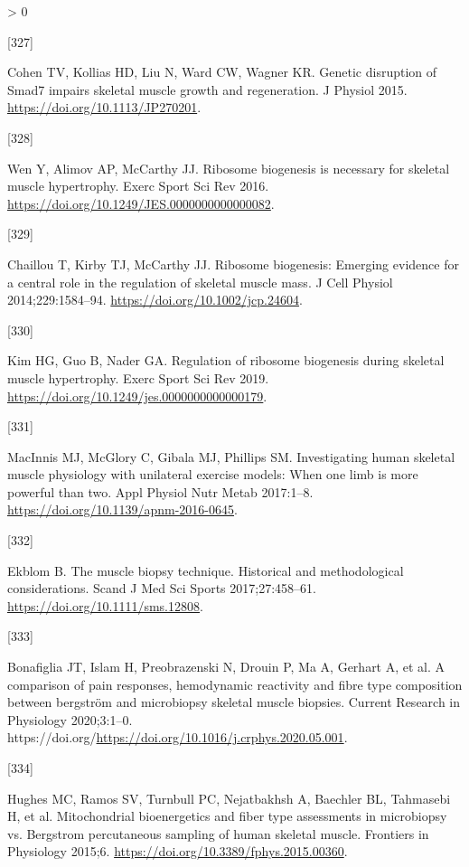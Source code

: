\documentclass[twoside,10pt]{gihclass} %
\newlength{\cslhangindent}
\newlength{\csllabelwidth}
\newenvironment{CSLReferences}[3] %
 {%
  \setlength{\parindent}{0pt}
  \ifodd #1 \everypar{\setlength{\hangindent}{\cslhangindent}}\ignorespaces\fi
  \ifnum #2 > 0
  \setlength{\parskip}{#2\baselineskip}
  \fi
 }%
 {}
\newcommand{\CSLLeftMargin}[1]{\parbox[t]{\maxof{\widthof{#1}}{\csllabelwidth}}{#1}}
\newcommand{\CSLRightInline}[1]{\parbox[t]{\linewidth}{#1}}
\begin{document}
\begin{CSLReferences}{0}{0}
\leavevmode\hypertarget{ref-RN1619}{}%
\CSLLeftMargin{{[}327{]} }
\CSLRightInline{Cohen TV, Kollias HD, Liu N, Ward CW, Wagner KR. Genetic disruption of Smad7 impairs skeletal muscle growth and regeneration. J Physiol 2015. \url{https://doi.org/10.1113/JP270201}.}

\leavevmode\hypertarget{ref-RN1757}{}%
\CSLLeftMargin{{[}328{]} }
\CSLRightInline{Wen Y, Alimov AP, McCarthy JJ. Ribosome biogenesis is necessary for skeletal muscle hypertrophy. Exerc Sport Sci Rev 2016. \url{https://doi.org/10.1249/JES.0000000000000082}.}

\leavevmode\hypertarget{ref-RN1654}{}%
\CSLLeftMargin{{[}329{]} }
\CSLRightInline{Chaillou T, Kirby TJ, McCarthy JJ. Ribosome biogenesis: Emerging evidence for a central role in the regulation of skeletal muscle mass. J Cell Physiol 2014;229:1584--94. \url{https://doi.org/10.1002/jcp.24604}.}

\leavevmode\hypertarget{ref-RN2150}{}%
\CSLLeftMargin{{[}330{]} }
\CSLRightInline{Kim HG, Guo B, Nader GA. Regulation of ribosome biogenesis during skeletal muscle hypertrophy. Exerc Sport Sci Rev 2019. \url{https://doi.org/10.1249/jes.0000000000000179}.}

\leavevmode\hypertarget{ref-RN1896}{}%
\CSLLeftMargin{{[}331{]} }
\CSLRightInline{MacInnis MJ, McGlory C, Gibala MJ, Phillips SM. Investigating human skeletal muscle physiology with unilateral exercise models: When one limb is more powerful than two. Appl Physiol Nutr Metab 2017:1--8. \url{https://doi.org/10.1139/apnm-2016-0645}.}

\leavevmode\hypertarget{ref-RN2549}{}%
\CSLLeftMargin{{[}332{]} }
\CSLRightInline{Ekblom B. The muscle biopsy technique. Historical and methodological considerations. Scand J Med Sci Sports 2017;27:458--61. \url{https://doi.org/10.1111/sms.12808}.}

\leavevmode\hypertarget{ref-RN2553}{}%
\CSLLeftMargin{{[}333{]} }
\CSLRightInline{Bonafiglia JT, Islam H, Preobrazenski N, Drouin P, Ma A, Gerhart A, et al. A comparison of pain responses, hemodynamic reactivity and fibre type composition between bergström and microbiopsy skeletal muscle biopsies. Current Research in Physiology 2020;3:1--0. https://doi.org/\url{https://doi.org/10.1016/j.crphys.2020.05.001}.}

\leavevmode\hypertarget{ref-RN2552}{}%
\CSLLeftMargin{{[}334{]} }
\CSLRightInline{Hughes MC, Ramos SV, Turnbull PC, Nejatbakhsh A, Baechler BL, Tahmasebi H, et al. Mitochondrial bioenergetics and fiber type assessments in microbiopsy vs. Bergstrom percutaneous sampling of human skeletal muscle. Frontiers in Physiology 2015;6. \url{https://doi.org/10.3389/fphys.2015.00360}.}


\end{CSLReferences}
\end{document}
